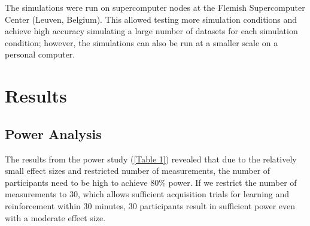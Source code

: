 \documentclass{article}
\begin{document}
The simulations were run on supercomputer nodes at the Flemish Supercomputer Center (Leuven, Belgium). This allowed testing more simulation conditions and achieve high accuracy simulating a large number of datasets for each simulation condition; however, the simulations can also be run at a smaller scale on a personal computer. 

\section{Results} 

\subsection{Power Analysis} 

The results from the power study (\ref{Table 1}) revealed that due to the relatively small effect sizes and restricted number of measurements, the number of participants need to be high to achieve 80\% power. If we restrict the number of measurements to 30, which allows sufficient acquisition trials for learning and reinforcement within 30 minutes, 30 participants result in sufficient power even with a moderate effect size. 
\end{document}
